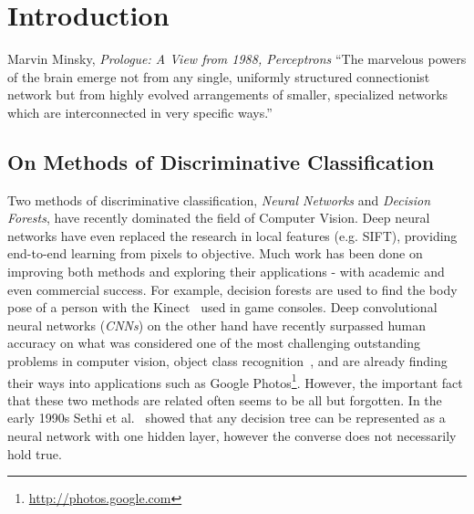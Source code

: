 \documentclass[thesis]{subfiles}
\begin{document}

\chapter{Introduction}  %

\begin{chapquote}{Marvin Minsky, \textit{Prologue: A View from 1988, Perceptrons}}
``The marvelous powers of the brain emerge not from any single, uniformly structured connectionist network but from highly evolved arrangements of smaller, specialized networks which are interconnected in very specific ways.''
\end{chapquote}
\section{On Methods of Discriminative Classification} %

Two methods of discriminative classification, \emph{Neural Networks} and \emph{Decision Forests}, have recently dominated the field of Computer Vision. Deep neural networks have even replaced the research in local features (e.g. SIFT), providing end-to-end learning from pixels to objective. Much work has been done on improving both methods and exploring their applications - with academic and even commercial success. For example, decision forests are used to find the body pose of a person with the Kinect~\cite{conf/cvpr/ShottonFCSFMKB11} used in game consoles. Deep convolutional neural networks (\emph{CNNs}) on the other hand have recently surpassed human accuracy on what was considered one of the most challenging outstanding problems in computer vision, object class recognition~\cite{journals/corr/HeZR015}, and are already finding their ways into applications such as Google Photos\footnote{\href{http://photos.google.com}{http://photos.google.com}}. However, the important fact that these two methods are related often seems to be all but forgotten. In the early 1990s Sethi et al.~\cite{Sethi1990} showed that any decision tree can be represented as a neural network with one hidden layer, however the converse does not necessarily hold true.
\end{document}
